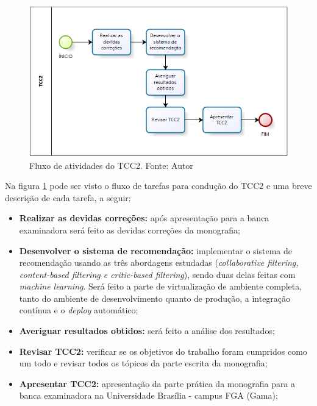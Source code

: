 \begin{figure}[H]
    \centering
    \includegraphics[scale=0.9]{figuras/proposta/fluxo_atividade_tcc2.png}
    \caption[Fluxo de atividades do TCC2]{Fluxo de atividades do TCC2. Fonte: Autor}
    \label{fig:fluxo_atividade_tcc2}
\end{figure}

Na figura \ref{fig:fluxo_atividade_tcc2} pode ser visto o fluxo de tarefas para condução do TCC2 e uma breve descrição de cada tarefa, a seguir:

\begin{itemize}
    \item \textbf{Realizar as devidas correções:} após apresentação para a banca examinadora será feito as devidas correções da monografia;

    \item \textbf{Desenvolver o sistema de recomendação:} implementar o sistema de recomendação usando as três abordagens estudadas (\textit{collaborative filtering, content-based filtering e critic-based filtering}), sendo duas delas feitas com \textit{machine learning}. Será feito a parte de virtualização de ambiente completa, tanto do ambiente de desenvolvimento quanto de produção, a integração contínua e o \textit{deploy} automático;

    \item \textbf{Averiguar resultados obtidos:} será feito a análise dos resultados;
    
    \item \textbf{Revisar TCC2:} verificar se os objetivos do trabalho foram cumpridos como um todo e revisar todos os tópicos da parte escrita da monografia;

    \item \textbf{Apresentar TCC2:} apresentação da parte prática da monografia para a banca examinadora na Universidade Brasília - campus FGA (Gama);
    
\end{itemize}

